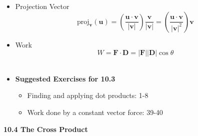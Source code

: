 \documentclass[12pt]{article}
\renewcommand{\vec}[1]{\mathbf{#1}}
\newcommand{\proj}{\textrm{proj}}
\newcommand{\<}{\left<}
\renewcommand{\>}{\right>}
\begin{document}
\begin{itemize}
    \item Projection Vector
      \[\proj_{\vec{v}}(\vec{u}) = \left(\frac{\vec{u}\cdot\vec{v}}{|\vec{v}|} \right)\frac{\vec{v}}{|\vec{v}|} = \left(\frac{\vec{u}\cdot\vec{v}}{|\vec{v}|^2} \right)\vec{v}\]

    \item Work
      \[W = \vec{F} \cdot \vec{D} = |\vec{F}||\vec{D}|\cos \theta\]\
    
    \item \textbf{Suggested Exercises for 10.3}
      \begin{itemize}
      \item Finding and applying dot products: 1-8
      \item Work done by a constant vector force: 39-40
      \end{itemize}
    \end{itemize}
  
\newpage

\centerline{\bf 10.4 The Cross Product}
  
\end{document}
